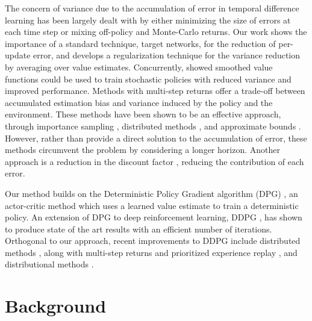 \documentclass{article}
\begin{document}
The concern of variance due to the accumulation of error in temporal difference learning has been largely dealt with by either minimizing the size of errors at each time step or mixing off-policy and Monte-Carlo returns. Our work shows the importance of a standard technique, target networks, for the reduction of per-update error, and develops a regularization technique for the variance reduction by averaging over value estimates. Concurrently, \citet{Smoothie} showed smoothed value functions could be used to train stochastic policies with reduced variance and improved performance. Methods with multi-step returns offer a trade-off between accumulated estimation bias and variance induced by the policy and the environment. These methods have been shown to be an effective approach, through importance sampling \cite{precup2001off, munos2016safe}, distributed methods \cite{a3c,espeholt2018impala}, and approximate bounds \cite{optimalitytightening}. However, rather than provide a direct solution to the accumulation of error, these methods circumvent the problem by considering a longer horizon. Another approach is a reduction in the discount factor \cite{petrik2009discount}, reducing the contribution of each error.

Our method builds on the Deterministic Policy Gradient algorithm (DPG) \citep{DPG}, an actor-critic method which uses a learned value estimate to train a deterministic policy. An extension of DPG to deep reinforcement learning, DDPG \cite{DDPG}, has shown to produce state of the art results with an efficient number of iterations.
Orthogonal to our approach, recent improvements to DDPG include distributed methods \cite{popov2017data}, along with multi-step returns and prioritized experience replay \cite{PrioritizedExpReplay, horgan2018distributed}, and distributional methods \cite{bellemare2017distributional, barth-maron2018distributional}. 

\section{Background}
\end{document}
